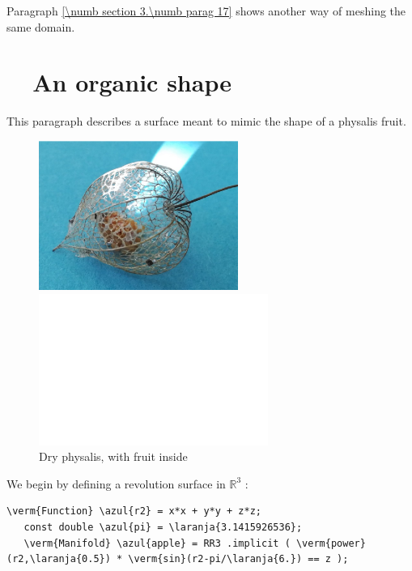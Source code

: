 Paragraph \ref{\numb section 3.\numb parag 17} shows another way of meshing the same domain.
\vfil\eject


\section{~~An organic shape}\label{\numb section 2.\numb parag 11}

This paragraph describes a surface meant to mimic the shape of a physalis fruit.


\begin{figure}[ht]\centering
\if{}
\centerline{\includegraphics[width=65mm]{dry-physalis}}
\else
{}
\centerline{\includegraphics[width=75mm]{fake-physalis}}
\fi
  \caption{Dry physalis, with fruit inside}\label{\numb section 2.\numb fig 11}
\end{figure}

We begin by defining a revolution surface in $ \mathbb{R}^3 $ :

\begin{Verbatim}[commandchars=\\\{\},formatcom=\small\tt,frame=single,
   label=parag-\ref{\numb section 2.\numb parag 11}.cpp,rulecolor=\color{coment},
   baselinestretch=0.94,framesep=2mm]
   \verm{Function} \azul{r2} = x*x + y*y + z*z;
   const double \azul{pi} = \laranja{3.1415926536};
   \verm{Manifold} \azul{apple} = RR3 .implicit ( \verm{power}(r2,\laranja{0.5}) * \verm{sin}(r2-pi/\laranja{6.}) == z );
\end{Verbatim}

